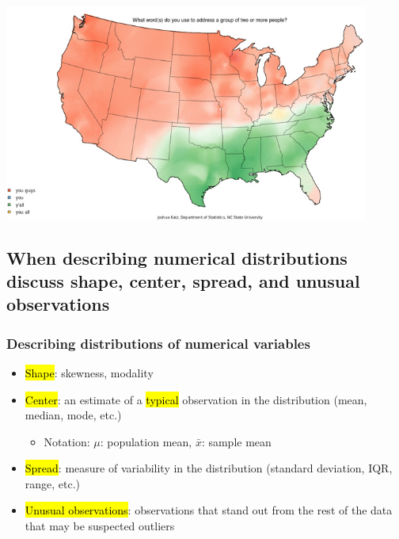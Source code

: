 \documentclass[11pt,containsverbatim,handout,xcolor=xelatex,dvipsnames,table]{beamer}
\begin{document}

\begin{frame}
\frametitle{}


\begin{center}
\includegraphics[width=0.9\textwidth]{figures/spatial/yalls}
\end{center}


\end{frame}


\subsection{When describing numerical distributions discuss shape, center, spread, and unusual observations}
\label{mi2}


\begin{frame}
\frametitle{Describing distributions of numerical variables}

\begin{itemize}

\item \hl{Shape}: skewness, modality

\item \hl{Center}: an estimate of a \hl{typical} observation in the distribution (mean, median, mode, etc.) 
\begin{itemize}
\item Notation: $\mu$: population mean, $\bar{x}$: sample mean
\end{itemize}

\item \hl{Spread}: measure of variability in the distribution (standard deviation, IQR, range, etc.)

\item \hl{Unusual observations}: observations that stand out from the rest of the data that may be suspected outliers

\end{itemize}

\end{frame}
\end{document}
